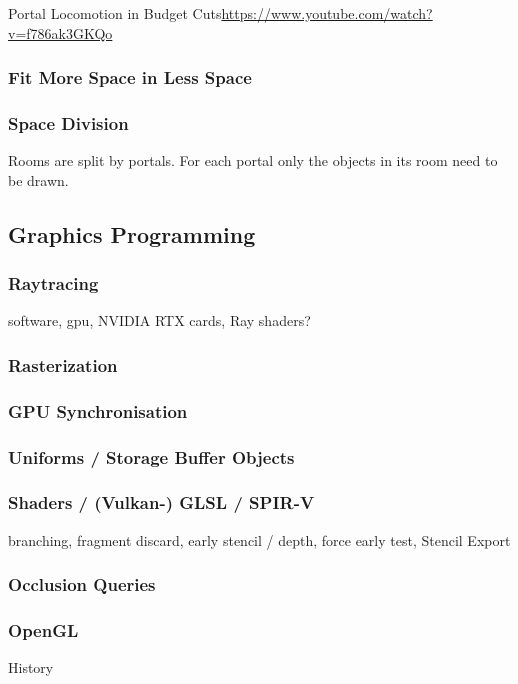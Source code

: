 Portal Locomotion in Budget Cuts\url{https://www.youtube.com/watch?v=f786ak3GKQo}

\subsubsection{Fit More Space in Less Space}

\subsubsection{Space Division}
Rooms are split by portals. For each portal only the objects in its room need to be drawn.
\cite{ lowe:2005:technique}

\subsection{Graphics Programming}


\subsubsection{Raytracing}
software,
gpu,
NVIDIA RTX cards, Ray shaders?

\subsubsection{Rasterization}

\subsubsection{GPU Synchronisation}

\subsubsection{Uniforms / Storage Buffer Objects}

\subsubsection{Shaders / (Vulkan-) GLSL / SPIR-V}
branching, fragment discard, early stencil / depth, force early test, Stencil Export

\subsubsection{Occlusion Queries}

\subsubsection{OpenGL}
History

